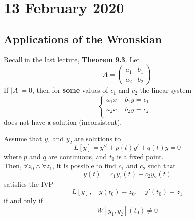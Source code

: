 \documentclass[diffeq.tex]{subfiles}
\begin{document}
\chapter{13 February 2020}
    \section{Applications of the Wronskian}
    \begin{corollary}
        Recall in the last lecture, \textbf{Theorem 9.3}.
        Let
        \begin{equation}
            A = \begin{pmatrix}
                a_{1} & b_{1}\\
                a_{2} & b_{2}
            \end{pmatrix}
        \end{equation}
        If $|A| = 0$, then for \textbf{some} values of $c_{1}$ and $c_{2}$ the linear system
        \begin{equation}
            \begin{cases}
                a_{1}x + b_{1}y = c_{1}&\\
                a_{2}x + b_{2}y = c_{2}&\\
            \end{cases}
        \end{equation}
        does not have a solution (inconsistent).
    \end{corollary}
    \np
    \begin{theorem}
        Assume that $y_{1}$ and $y_{2}$ are solutions to
        \begin{equation}
            L[y] = y'' + p(t)y' + q(t)y = 0
        \end{equation}
        where $p$ and $q$ are continuous, and $t_{0}$ is a fixed point.\\
        Then, $\forall z_{0} \wedge \forall z_{1}$, it is possible to find $c_{1}$ and $c_{2}$ such that
        \begin{equation}
            y(t) = c_{1}y_{1}(t) + c_{2}y_{2}(t)
        \end{equation}
        satisfies the IVP
        \begin{equation}
            L[y],\quad  y(t_{0}) = z_{0},\quad y'(t_{0}) = z_{1}
        \end{equation}
        if and only if
        \begin{equation}
            W[y_{1}, y_{2}](t_{0}) \neq 0
        \end{equation}
    \end{theorem}
\end{document}

